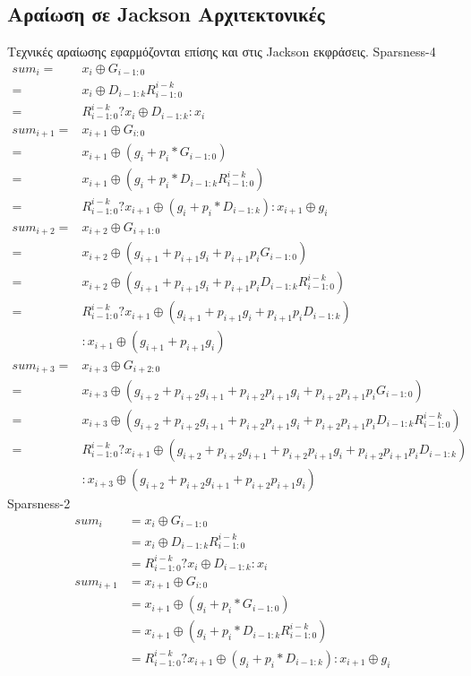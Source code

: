 \subsection{Αραίωση σε Jackson Αρχιτεκτονικές}
Τεχνικές αραίωσης εφαρμόζονται επίσης και στις Jackson εκφράσεις.
\label{Jackson_sparse}
Sparsness-4
\begin{equation*}
    \begin{split}
        sum_i =& x_i \oplus G_{i-1:0}\\
        =& x_i \oplus D_{i-1:k}R^{i-k}_{i-1:0}\\
        =& R^{i-k}_{i-1:0} ? x_i \oplus D_{i-1:k} : x_i\\
        sum_{i+1} =& x_{i+1} \oplus G_{i:0}\\
        =& x_{i+1} \oplus (g_i + p_i*G_{i-1:0})\\
        =& x_{i+1} \oplus (g_i + p_i*D_{i-1:k}R^{i-k}_{i-1:0})\\
        =& R^{i-k}_{i-1:0} ? x_{i+1} \oplus (g_i + p_i*D_{i-1:k}) : x_{i+1} \oplus g_i\\
        sum_{i+2} =& x_{i+2} \oplus G_{i+1:0}\\
        =& x_{i+2} \oplus (g_{i+1} + p_{i+1}g_i + p_{i+1}p_iG_{i-1:0})\\
        =& x_{i+2} \oplus (g_{i+1} + p_{i+1}g_i + p_{i+1}p_iD_{i-1:k}R^{i-k}_{i-1:0})\\
        =& R^{i-k}_{i-1:0} ? x_{i+1} \oplus (g_{i+1} + p_{i+1}g_i + p_{i+1}p_iD_{i-1:k}) \\&: x_{i+1} \oplus (g_{i+1} + p_{i+1}g_i)\\
        sum_{i+3} =& x_{i+3} \oplus G_{i+2:0}\\
        =& x_{i+3} \oplus (g_{i+2} + p_{i+2}g_{i+1} + p_{i+2}p_{i+1}g_i + p_{i+2}p_{i+1}p_iG_{i-1:0})\\
        =& x_{i+3} \oplus (g_{i+2} + p_{i+2}g_{i+1} + p_{i+2}p_{i+1}g_i + p_{i+2}p_{i+1}p_iD_{i-1:k}R^{i-k}_{i-1:0})\\
        =& R^{i-k}_{i-1:0} ? x_{i+1} \oplus (g_{i+2} + p_{i+2}g_{i+1} + p_{i+2}p_{i+1}g_i + p_{i+2}p_{i+1}p_iD_{i-1:k}) \\&: x_{i+3} \oplus (g_{i+2} + p_{i+2}g_{i+1} + p_{i+2}p_{i+1}g_i)
    \end{split} 
\end{equation*}
Sparsness-2
 \begin{equation*}
    \begin{split}
        sum_i &= x_i \oplus G_{i-1:0}\\
              &= x_i \oplus D_{i-1:k}R^{i-k}_{i-1:0}\\
              &= R^{i-k}_{i-1:0} ? x_i \oplus D_{i-1:k} : x_i\\
        sum_{i+1} &= x_{i+1} \oplus G_{i:0}\\
                  &= x_{i+1} \oplus (g_i + p_i*G_{i-1:0})\\
                  &= x_{i+1} \oplus (g_i + p_i*D_{i-1:k}R^{i-k}_{i-1:0})\\
                  &= R^{i-k}_{i-1:0} ? x_{i+1} \oplus (g_i + p_i*D_{i-1:k}) : x_{i+1} \oplus g_i
    \end{split} 
 \end{equation*}




